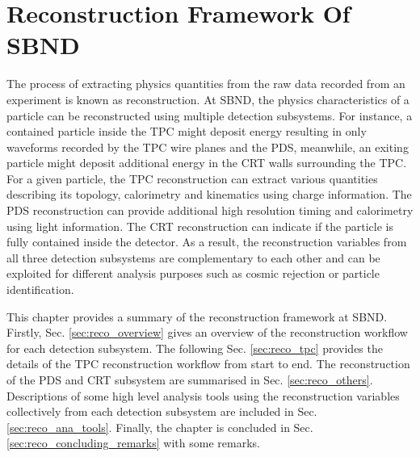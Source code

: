 
\chapter{Reconstruction Framework Of SBND}
\label{ChapterReco}

\ifpdf
    \graphicspath{{Chapter6/Figs/Raster/}{Chapter6/Figs/PDF/}{Chapter6/Figs/}}
\else
    \graphicspath{{Chapter6/Figs/Vector/}{Chapter6/Figs/}}
\fi


The process of extracting physics quantities from the raw data recorded from an experiment is known as reconstruction.
At SBND, the physics characteristics of a particle can be reconstructed using multiple detection subsystems. 
For instance, a contained particle inside the TPC might deposit energy resulting in only waveforms recorded by the TPC wire planes and the PDS, meanwhile, an exiting particle might deposit additional energy in the CRT walls surrounding the TPC.
For a given particle, the TPC reconstruction can extract various quantities describing its topology, calorimetry and kinematics using charge information.
The PDS reconstruction can provide additional high resolution timing and calorimetry using light information.
The CRT reconstruction can indicate if the particle is fully contained inside the detector.
As a result, the reconstruction variables from all three detection subsystems are complementary to each other and can be exploited for different analysis purposes such as cosmic rejection or particle identification.

This chapter provides a summary of the reconstruction framework at SBND.
Firstly, Sec. \ref{sec:reco_overview} gives an overview of the reconstruction workflow for each detection subsystem. 
The following Sec. \ref{sec:reco_tpc} provides the details of the TPC reconstruction workflow from start to end.
The reconstruction of the PDS and CRT subsystem are summarised in Sec. \ref{sec:reco_others}.
Descriptions of some high level analysis tools using the reconstruction variables collectively from each detection subsystem are included in Sec. \ref{sec:reco_ana_tools}.                 
Finally, the chapter is concluded in Sec. \ref{sec:reco_concluding_remarks} with some remarks.

